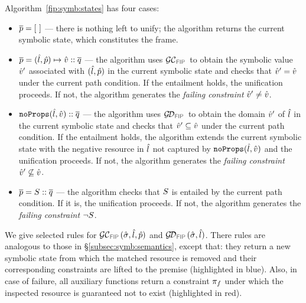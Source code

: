 Algorithm~\ref{fip:symb:states} has four cases: 
\begin{itemize}
   \item $\overline{p}=[ \ ]$ --- there is nothing left to unify; the algorithm 
            returns the current symbolic state, which constitutes the frame. 
   
   \item $\overline{p} = (\hat{l}, \hat{p}) \mapsto \hat{v} :: \overline{q}$ ---
            the algorithm uses $\GetCellVFun$ to obtain the symbolic value 
            $\hat{v}'$ associated with $(\hat{l}, \hat{p})$ in the current symbolic state and
            checks that $\hat{v}' = \hat{v}$ under the current path condition. 
            If the entailment holds, the unification proceeds. If not, the algorithm generates 
            the \emph{failing constraint} $\hat{v}' \neq \hat{v}$. 
  
   \item $\texttt{noProps}(\hat{l}, \hat{v}) :: \overline{q}$ ---
            the algorithm uses $\GetDomainVFun$ to obtain the domain $\hat{v}'$
            of $\hat{l}$ in the current symbolic state and 
            checks that $\hat{v}' \subseteq \hat{v}$ under the current path condition. 
            If the entailment holds, the algorithm extends the current symbolic state with the negative 
            resource in $\hat{l}$ not captured by $\texttt{noProps}(\hat{l}, \hat{v})$ and the unification proceeds. 
            If not, the algorithm generates the \emph{failing constraint} $\hat{v}' \not\subseteq \hat{v}$. 
            
   \item $\overline{p} = S :: \overline{q}$ --- 
            the algorithm checks that $S$ is entailed by the current path condition. 
             If it is, the unification proceeds. If not, the algorithm generates 
             the \emph{failing constraint} $\neg S$. 
\end{itemize}


We give selected rules for $\GetCellV{\sstate, \sloc, \sexprp}$ and $\GetDomainV{\sstate, \sloc}$. 
There rules are analogous to those in \S\ref{subsec:symb:semantics}, except that:  they return a new symbolic state 
from which the matched resource is removed and  their corresponding constraints are lifted to the premise (highlighted in blue). 
Also, in case of failure, all auxiliary functions return a constraint $\pi_f$ under which the inspected resource is guaranteed not 
to exist (highlighted in red). 


